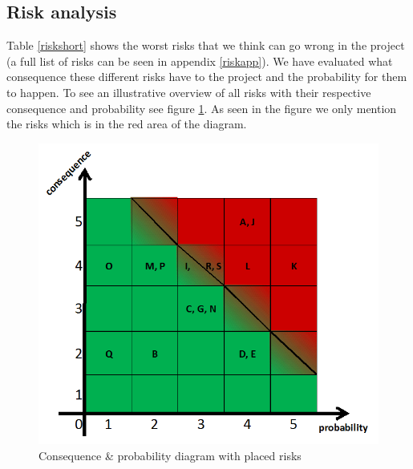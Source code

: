 \subsection{Risk analysis}
\label{risk}


Table \ref{riskshort} shows the worst risks that we think can go wrong in the project (a full list of risks can be seen in appendix \ref{riskapp}). We have evaluated what consequence these different risks have to the project and the probability for them to happen. To see an illustrative overview of all risks with their respective consequence and probability see figure \ref{cxp}. As seen in the figure we only mention the risks which is in the red area of the diagram.


\begin{figure}[h!]
\centering
\label{cxp}
\includegraphics[scale=0.4]{./graphics/cxp}
\caption{Consequence \& probability diagram with placed risks}
\end{figure}

